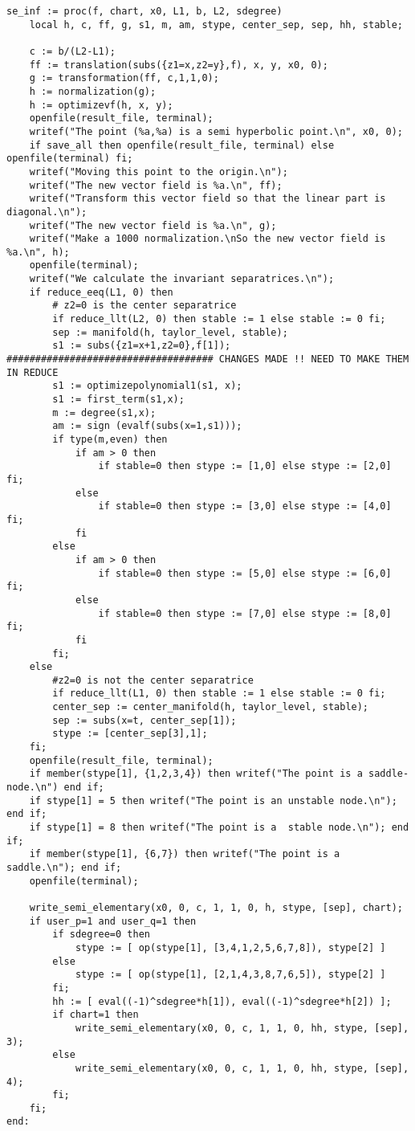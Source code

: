\documentclass[a4paper,10pt]{article}
\begin{document}
\begin{lstlisting}[name=infinity]
se_inf := proc(f, chart, x0, L1, b, L2, sdegree)
    local h, c, ff, g, s1, m, am, stype, center_sep, sep, hh, stable;

    c := b/(L2-L1);
    ff := translation(subs({z1=x,z2=y},f), x, y, x0, 0);
    g := transformation(ff, c,1,1,0);
    h := normalization(g);
    h := optimizevf(h, x, y);
    openfile(result_file, terminal);
    writef("The point (%a,%a) is a semi hyperbolic point.\n", x0, 0);
    if save_all then openfile(result_file, terminal) else openfile(terminal) fi;
    writef("Moving this point to the origin.\n");
    writef("The new vector field is %a.\n", ff);
    writef("Transform this vector field so that the linear part is diagonal.\n");
    writef("The new vector field is %a.\n", g);
    writef("Make a 1000 normalization.\nSo the new vector field is %a.\n", h);
    openfile(terminal);
    writef("We calculate the invariant separatrices.\n");
    if reduce_eeq(L1, 0) then
        # z2=0 is the center separatrice
        if reduce_llt(L2, 0) then stable := 1 else stable := 0 fi;
        sep := manifold(h, taylor_level, stable);
        s1 := subs({z1=x+1,z2=0},f[1]); #################################### CHANGES MADE !! NEED TO MAKE THEM IN REDUCE
        s1 := optimizepolynomial1(s1, x);
        s1 := first_term(s1,x);
        m := degree(s1,x);
        am := sign (evalf(subs(x=1,s1)));
        if type(m,even) then
            if am > 0 then
                if stable=0 then stype := [1,0] else stype := [2,0] fi;
            else
                if stable=0 then stype := [3,0] else stype := [4,0] fi;
            fi
        else
            if am > 0 then
                if stable=0 then stype := [5,0] else stype := [6,0] fi;
            else
                if stable=0 then stype := [7,0] else stype := [8,0] fi;
            fi
        fi;
    else
        #z2=0 is not the center separatrice
        if reduce_llt(L1, 0) then stable := 1 else stable := 0 fi;
        center_sep := center_manifold(h, taylor_level, stable);
        sep := subs(x=t, center_sep[1]);
        stype := [center_sep[3],1];
    fi;
    openfile(result_file, terminal);
    if member(stype[1], {1,2,3,4}) then writef("The point is a saddle-node.\n") end if;
    if stype[1] = 5 then writef("The point is an unstable node.\n"); end if;
    if stype[1] = 8 then writef("The point is a  stable node.\n"); end if;
    if member(stype[1], {6,7}) then writef("The point is a saddle.\n"); end if;
    openfile(terminal);

    write_semi_elementary(x0, 0, c, 1, 1, 0, h, stype, [sep], chart);
    if user_p=1 and user_q=1 then
        if sdegree=0 then
            stype := [ op(stype[1], [3,4,1,2,5,6,7,8]), stype[2] ]
        else
            stype := [ op(stype[1], [2,1,4,3,8,7,6,5]), stype[2] ]
        fi;
        hh := [ eval((-1)^sdegree*h[1]), eval((-1)^sdegree*h[2]) ];
        if chart=1 then
            write_semi_elementary(x0, 0, c, 1, 1, 0, hh, stype, [sep], 3);
        else
            write_semi_elementary(x0, 0, c, 1, 1, 0, hh, stype, [sep], 4);
        fi;
    fi;
end:
\end{lstlisting}
\end{document}
